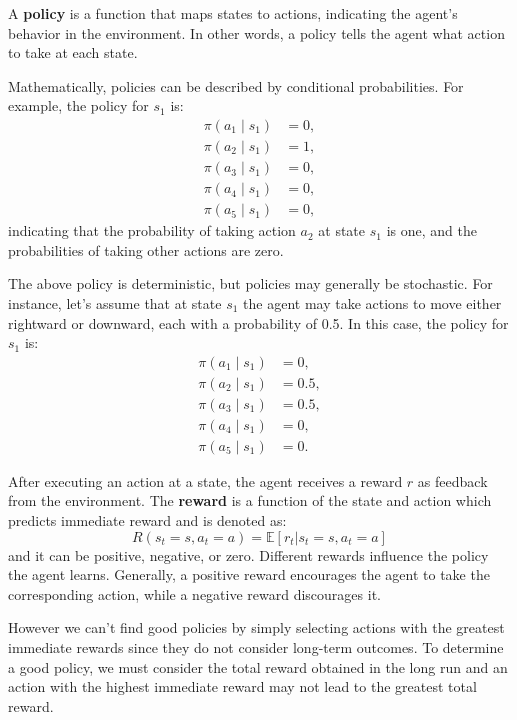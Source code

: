 A \textbf{policy} is a function that maps states to actions,
indicating the agent's behavior in the environment.
In other words, a policy tells the agent what action to take
at each state.

Mathematically, policies can be described by conditional probabilities.
For example, the policy for \( s_1 \) is:
\[
\begin{aligned}
\pi(a_1 \mid s_1) &= 0, \\
\pi(a_2 \mid s_1) &= 1, \\
\pi(a_3 \mid s_1) &= 0, \\
\pi(a_4 \mid s_1) &= 0, \\
\pi(a_5 \mid s_1) &= 0,
\end{aligned}
\]
indicating that the probability of taking action \( a_2 \) at state \( s_1 \)
is one, and the probabilities of taking other actions are zero.

The above policy is deterministic, but policies may generally be stochastic.
For instance, let's assume that at state \( s_1 \)
the agent may take actions to move either rightward or downward,
each with a probability of 0.5. In this case, the policy for \( s_1 \) is:
\[
\begin{aligned}
\pi(a_1 \mid s_1) &= 0, \\
\pi(a_2 \mid s_1) &= 0.5, \\
\pi(a_3 \mid s_1) &= 0.5, \\
\pi(a_4 \mid s_1) &= 0, \\
\pi(a_5 \mid s_1) &= 0.
\end{aligned}
\]

After executing an action at a state, the agent receives a
reward \( r \) as feedback from the environment.
The \textbf{reward} is a function of the state and action
which predicts immediate reward and is denoted as:
\[ R(s_t=s, a_t=a) = \mathbb{E} [r_t | s_t = s, a_t = a] \]
and it can be positive, negative, or zero.
Different rewards influence the policy the agent learns.
Generally, a positive reward encourages the agent to take the
corresponding action, while a negative reward discourages it.

However we can't find good policies
by simply selecting actions with the greatest immediate rewards
since they do not consider
long-term outcomes. To determine a good policy, we must consider the total
reward obtained in the long run and
an action with the highest immediate reward may not lead to
the greatest total reward.

